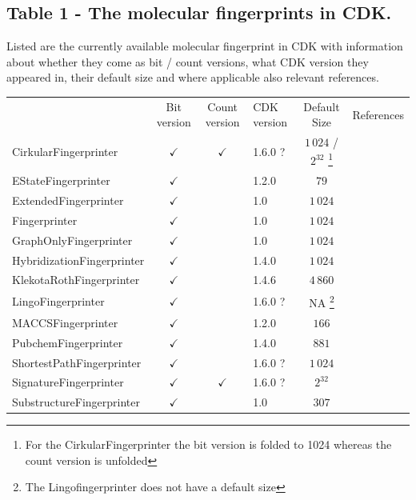 \documentclass[10pt]{bmcart}
\begin{document}
\begin{backmatter}
  \subsection*{Table 1 - The molecular fingerprints in CDK.}
  \label{tab:fingerprints}
  Listed are the currently available molecular fingerprint in CDK with
  information about whether they come as bit / count versions, what CDK version
  they appeared in, their default size and where applicable also relevant
  references.
  \baselineskip

    \begin{minipage}{1\textwidth}
    \renewcommand*{\thempfootnote}{\fnsymbol{mpfootnote}}
    \centering
    \begin{tabular}{lcclcc}
                             & Bit version  & Count version & CDK version & Default Size    & References \\
  CirkularFingerprinter      & $\checkmark$ & $\checkmark$  & 1.6.0 ?     & $1\,024$ / $2^{32}$%
\footnote[1]{For the CirkularFingerprinter the bit version is folded to 1024 whereas the count version is unfolded}
                                                                                            & \cite{rogers2010extended, Clark2014} \\
  EStateFingerprinter        & $\checkmark$ &               & 1.2.0       & $79$            & \cite{Hall1995} \\
  ExtendedFingerprinter      & $\checkmark$ &               & 1.0         & $1\,024$        & \\
  Fingerprinter              & $\checkmark$ &               & 1.0         & $1\,024$        & \\
  GraphOnlyFingerprinter     & $\checkmark$ &               & 1.0         & $1\,024$        & \\
  HybridizationFingerprinter & $\checkmark$ &               & 1.4.0       & $1\,024$        & \\
  KlekotaRothFingerprinter   & $\checkmark$ &               & 1.4.6       & $4\,860$        & \cite{Klekota2008} \\
  LingoFingerprinter         & $\checkmark$ &               & 1.6.0 ?     & NA%
\footnote[2]{The Lingofingerprinter does not have a default size}               
                                                                                            & \cite{vidal2005lingo} \\
  MACCSFingerprinter         & $\checkmark$ &               & 1.2.0       & $166$           & \\
  PubchemFingerprinter       & $\checkmark$ &               & 1.4.0       & $881$           & \cite{pubchemFP} \\
  ShortestPathFingerprinter  & $\checkmark$ &               & 1.6.0 ?     & $1\,024$        & \\
  SignatureFingerprinter     & $\checkmark$ & $\checkmark$  & 1.6.0 ?     & $2^{32}$        & \cite{signaturefingerprints} \\
  SubstructureFingerprinter  & $\checkmark$ &               & 1.0         & $307$           & \\


\end{tabular}
\end{minipage}
\end{backmatter}
\end{document}
